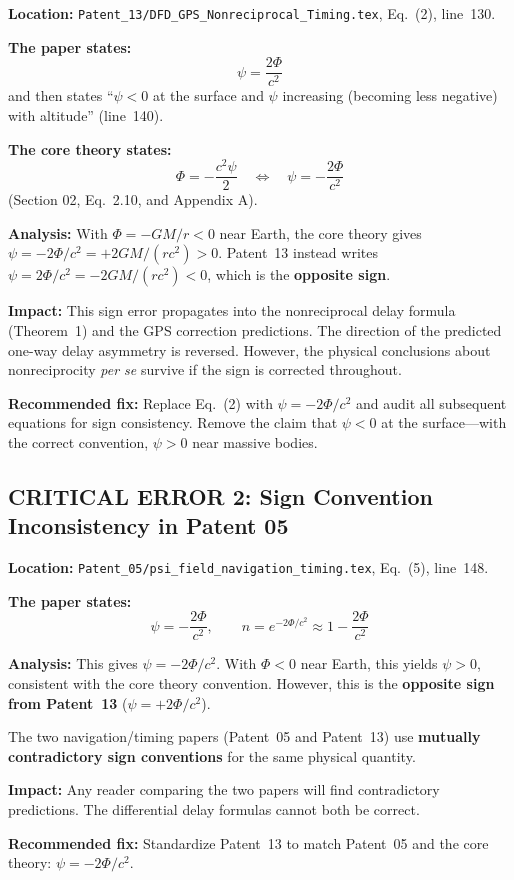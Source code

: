 \documentclass[12pt,a4paper]{article}
\begin{document}
\begin{critical}
\textbf{Location:} \texttt{Patent\_13/DFD\_GPS\_Nonreciprocal\_Timing.tex},
Eq.~(2), line~130.

\medskip
\textbf{The paper states:}
\[
\psi = \frac{2\Phi}{c^2}
\]
and then states ``$\psi < 0$ at the surface and $\psi$ increasing (becoming
less negative) with altitude'' (line~140).

\medskip
\textbf{The core theory states:}
\[
\Phi = -\frac{c^2\psi}{2} \quad\Longleftrightarrow\quad
\psi = -\frac{2\Phi}{c^2}
\]
(Section 02, Eq.~2.10, and Appendix A).

\medskip
\textbf{Analysis:} With $\Phi = -GM/r < 0$ near Earth, the core theory gives
$\psi = -2\Phi/c^2 = +2GM/(rc^2) > 0$. Patent~13 instead writes
$\psi = 2\Phi/c^2 = -2GM/(rc^2) < 0$, which is the \textbf{opposite sign}.

\medskip
\textbf{Impact:} This sign error propagates into the nonreciprocal delay
formula (Theorem~1) and the GPS correction predictions. The direction of
the predicted one-way delay asymmetry is reversed. However, the physical
conclusions about nonreciprocity \emph{per se} survive if the sign is
corrected throughout.

\medskip
\textbf{Recommended fix:} Replace Eq.~(2) with
$\psi = -2\Phi/c^2$ and audit all subsequent equations for sign consistency.
Remove the claim that $\psi < 0$ at the surface---with the correct convention,
$\psi > 0$ near massive bodies.
\end{critical}

\subsection{CRITICAL ERROR 2: Sign Convention Inconsistency in Patent 05}
\label{sec:crit2}

\begin{critical}
\textbf{Location:} \texttt{Patent\_05/psi\_field\_navigation\_timing.tex},
Eq.~(5), line~148.

\medskip
\textbf{The paper states:}
\[
\psi = -\frac{2\Phi}{c^2}, \qquad n = e^{-2\Phi/c^2} \approx 1 - \frac{2\Phi}{c^2}
\]

\medskip
\textbf{Analysis:} This gives $\psi = -2\Phi/c^2$. With $\Phi < 0$ near
Earth, this yields $\psi > 0$, consistent with the core theory convention.
However, this is the \textbf{opposite sign from Patent~13}
($\psi = +2\Phi/c^2$).

The two navigation/timing papers (Patent~05 and Patent~13) use
\textbf{mutually contradictory sign conventions} for the same physical
quantity.

\medskip
\textbf{Impact:} Any reader comparing the two papers will find contradictory
predictions. The differential delay formulas cannot both be correct.

\medskip
\textbf{Recommended fix:} Standardize Patent~13 to match Patent~05 and the
core theory: $\psi = -2\Phi/c^2$.
\end{critical}
\end{document}
